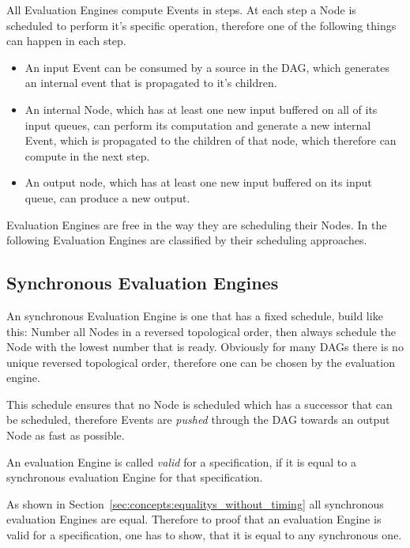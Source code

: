 All Evaluation Engines compute Events in steps.
At each step a Node is scheduled to perform it's specific operation, therefore one of the following things can happen in each step.

\begin{itemize}
  \item An input Event can be consumed by a source in the DAG, which generates an internal event that is propagated to it's children.
  \item An internal Node, which has at least one new input buffered on all of its input queues, can perform
    its computation and generate a new internal Event, which is propagated to the children of that node, which therefore can compute in the next step.
  \item An output node, which has at least one new input buffered on its input queue, can produce a new output.
\end{itemize}

Evaluation Engines are free in the way they are scheduling their Nodes.
In the following Evaluation Engines are classified by their scheduling approaches.

\subsection{Synchronous Evaluation Engines}
\label{sec:concepts:behaviour_without_timing:synchronous}

An synchronous Evaluation Engine is one that has a fixed schedule, build like this:
Number all Nodes in a reversed topological order, then always schedule the Node with the lowest number that is ready.
Obviously for many DAGs there is no unique reversed topological order, therefore one can be chosen by the evaluation engine.

This schedule ensures that no Node is scheduled which has a successor that can be scheduled, therefore Events are \emph{pushed} through the DAG towards an output Node as fast as possible.

\begin{definition}
  An evaluation Engine is called \emph{valid} for a specification, if it is equal to a synchronous evaluation Engine for that specification.
\label{def:valid_eval_engine}
\end{definition}

As shown in Section~\ref{sec:concepts:equalitys_without_timing} all synchronous evaluation Engines are equal.
Therefore to proof that an evaluation Engine is valid for a specification, one has to show, that it is equal to any synchronous one.


